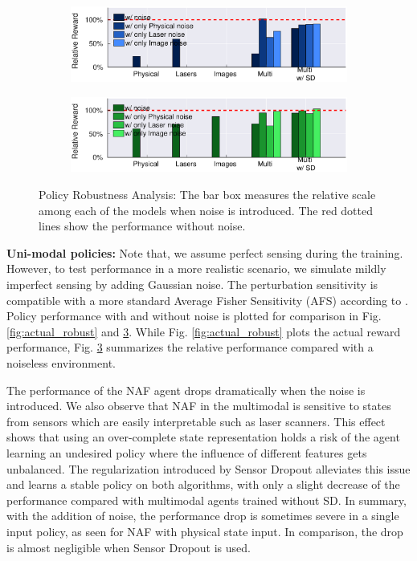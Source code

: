 \documentclass[../thesis.tex]{subfiles}
\begin{document}
\begin{figure}[t]
    \centering
    \begin{subfigure}[b]{0.48\linewidth}
        \includegraphics[width=\columnwidth,trim= 35 180 45 25, clip=true]{./MultimodalDRL/fig/relative_robust_naf}
        \label{fig:relative_robust_naf}
    \end{subfigure}
    \begin{subfigure}[b]{0.48\linewidth}
        \includegraphics[width=\columnwidth,trim= 35 180 45 25, clip=true]{./MultimodalDRL/fig/relative_robust_ddpg}
        \label{fig:relative_robust_ddpg}
    \end{subfigure}
    \caption{Policy Robustness Analysis: The bar box measures the relative scale among each of the models when noise is introduced. The red dotted lines show the performance without noise.}
    \label{fig:relative_robust}
\end{figure}
 
\textbf{Uni-modal policies:}
Note that, we assume perfect sensing during the training. However, to test performance in a more realistic scenario, we simulate mildly imperfect sensing by adding Gaussian noise. The perturbation sensitivity is compatible with a more standard Average Fisher Sensitivity (AFS) according to \cite{progressive_net}. Policy performance with and without noise is plotted for comparison in Fig. \ref{fig:actual_robust} and \ref{fig:relative_robust}. While Fig. \ref{fig:actual_robust} plots the actual reward performance, Fig. \ref{fig:relative_robust} summarizes the relative performance compared with a noiseless environment.
 
The performance of the NAF agent drops dramatically when the noise is introduced. We also observe that NAF in the multimodal is sensitive to states from sensors which are easily interpretable such as laser scanners. This effect shows that using an over-complete state representation holds a risk of the agent learning an undesired policy where the influence of different features gets unbalanced. The regularization introduced by Sensor Dropout alleviates this issue and learns a stable policy on both algorithms, with only a slight decrease of the performance compared with multimodal agents trained without SD. In summary, with the addition of noise, the performance drop is sometimes severe in a single input policy, as seen for NAF with physical state input. In comparison, the drop is almost negligible when Sensor Dropout is used.
 
\end{document}
